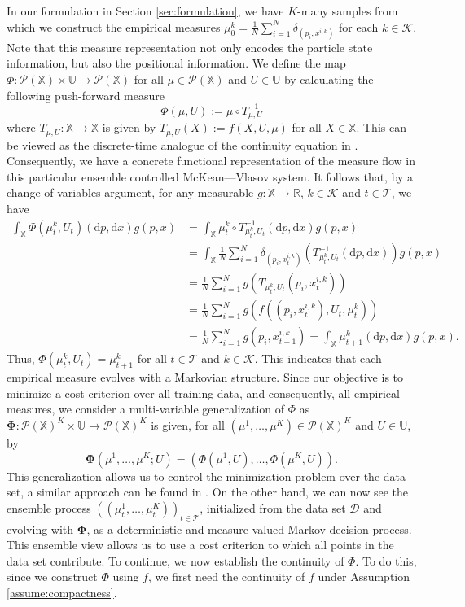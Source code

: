 \documentclass[11pt]{article}
\newcommand{\RR}{\mathbb{R}}
\newcommand{\XX}{\mathbb{X}}
\newcommand{\UU}{\mathbb{U}}
\newcommand{\cD}{\mathcal{D}}
\newcommand{\cK}{\mathcal{K}}
\newcommand{\cP}{\mathcal{P}}
\newcommand{\cT}{\mathcal{T}}
\newcommand{\de}{\mathrm{d}} %
\begin{document}
In our formulation in Section \ref{sec:formulation}, we have $K$-many samples from which we construct the empirical measures $\mu_0^k = \frac{1}{N}\sum_{i=1}^N\delta_{(p_i,x^{i,k})}$ for each $k\in\cK$. Note that this measure representation not only encodes the particle state information, but also the positional information. We define the map $\Phi:\cP(\XX)\times\UU\to\cP(\XX)$ for all $\mu\in\cP(\XX)$ and $U\in\UU$ by calculating the following push-forward measure
\begin{equation}\label{eq:measure-evolution}
    \Phi(\mu, U) := \mu\circ T_{\mu, U}^{-1}
\end{equation} 
where $T_{\mu, U}:\XX\to\XX$ is given by $T_{\mu, U}(X) := f(X,U,\mu)$ for all $X\in\XX$. This can be viewed as the discrete-time analogue of the continuity equation in \citep{geshkovski2025mathematical}. Consequently, we have a concrete functional representation of the measure flow in this particular ensemble controlled McKean---Vlasov system. It follows that, by a change of variables argument, for any measurable $g:\XX\to\RR$, $k\in\cK$ and $t\in\cT$, we have
\begin{align*}
    \int_\XX \Phi(\mu_t^{k}, U_t)(\de p, \de x)g(p,x) &= \int_\XX \mu_t^k\circ T_{\mu_t^k, U_t}^{-1}(\de p, \de x) g(p, x) \\
    &= \int_\XX\frac{1}{N}\sum_{i=1}^N \delta_{(p_i,x_t^{i,k})}(T_{\mu_t^k, U_t}^{-1}(\de p, \de x)) g(p,x) \\
    &= \frac{1}{N}\sum_{i=1}^N g(T_{\mu_t^k, U_t}(p_i,x_t^{i,k})) \\
    &= \frac{1}{N}\sum_{i=1}^N g(f((p_i,x_t^{i,k}), U_t, \mu_t^k)) \\
    &= \frac{1}{N}\sum_{i=1}^N g(p_i,x_{t+1}^{i,k}) = \int_\XX\mu_{t+1}^k(\de p, \de x) g(p,x).
\end{align*}
Thus, $\Phi(\mu_t^k, U_t) = \mu_{t+1}^k$ for all $t\in\cT$ and $k\in\cK$. This indicates that each empirical measure evolves with a Markovian structure. Since our objective is to minimize a cost criterion over all training data, and consequently, all empirical measures, we consider a multi-variable generalization of $\Phi$ as $\bm{\Phi}:\cP(\XX)^K\times\UU\to\cP(\XX)^K$ is given, for all $(\mu^1,\ldots,\mu^K)\in\cP(\XX)^K$ and $U\in\UU$, by
\begin{equation}\label{eq:ensemble-dynamics}
    \bm{\Phi}(\mu^1,\ldots,\mu^K; U) = (\Phi(\mu^1, U), \ldots, \Phi(\mu^K, U)).
\end{equation}
This generalization allows us to control the minimization problem over the data set, a similar approach can be found in \citep{E2019}. On the other hand, we can now see the ensemble process $((\mu_t^1,\ldots,\mu_t^K))_{t\in\overline{\cT}}$, initialized from the data set $\cD$ and evolving with $\bm{\Phi}$, as a deterministic and measure-valued Markov decision process. This ensemble view allows us to use a cost criterion to which all points in the data set contribute. To continue, we now establish the continuity of $\Phi$. To do this, since we construct $\Phi$ using $f$, we first need the continuity of $f$ under Assumption \ref{assume:compactness}.
\end{document}
